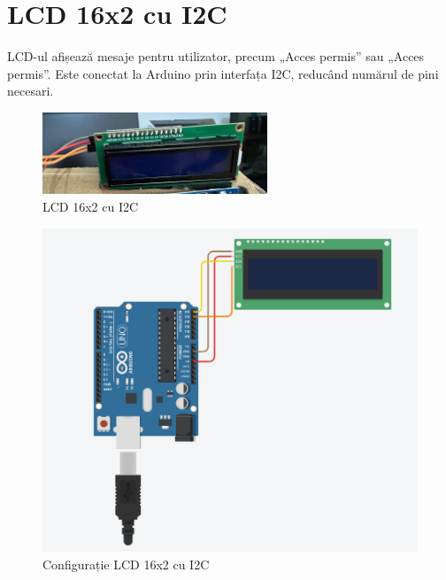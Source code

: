 \documentclass{report}
\begin{document}
\newpage
\vspace*{1cm}
\section{LCD 16x2 cu I2C}
LCD-ul afișează mesaje pentru utilizator, precum „Acces permis” sau „Acces permis”. Este conectat la Arduino prin interfața I2C, reducând numărul de pini necesari.

\begin{figure}[H]
    \centering
    \includegraphics[width=0.6\textwidth]{lcd_i2c.jpg}
    \caption{LCD 16x2 cu I2C}
    \label{fig:lcd_i2c}
\end{figure}


\begin{figure}[H]
    \centering
    \includegraphics[width=0.5\linewidth]{montaj-lcd+arduino.png}
    \caption{Configurație LCD 16x2 cu I2C}
    \label{fig:enter-label}
\end{figure}
\end{document}
